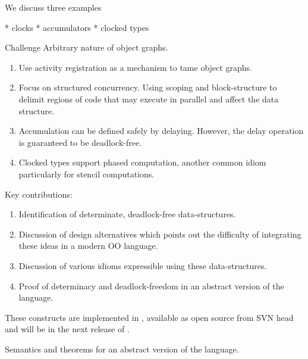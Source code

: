 We discuss three examples

  * clocks
  * accumulators
  * clocked types

Challenge
  Arbitrary nature of object graphs.


{\em 
\begin{enumerate}
\item Use activity registration as a mechanism to tame object graphs.
\item Focus on structured concurrency. Using scoping and block-structure
    to delimit regions of code that may execute in parallel and affect
    the data structure.

\item Accumulation can be defined safely by delaying. However, the delay
    operation is guaranteed to be deadlock-free.

\item Clocked types support phased computation, another common idiom
    particularly for stencil computations.
\end{enumerate}
}

Key contributions:
{\em 
\begin{enumerate}
\item Identification of determinate, deadlock-free data-structures. 
\item Discussion of design alternatives which points out the
  difficulty of integrating these ideas in a modern OO language.
\item Discussion of various idioms expressible using these data-structures.
\item Proof of determinacy and deadlock-freedom in an abstract version
  of the language.
\end{enumerate}
These constructs are implemented in \Xten, available as open source from
SVN head and will be in the next release of \Xten.
}


Semantics and theorems for an abstract version of the language.

